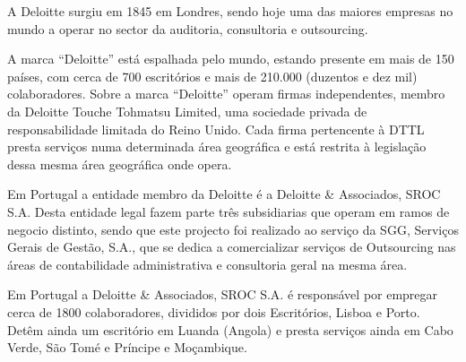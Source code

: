  A Deloitte surgiu em 1845 em Londres, sendo hoje uma das maiores empresas no mundo a operar no sector da auditoria, consultoria e outsourcing.
\par A marca “Deloitte” está espalhada pelo mundo, estando presente em mais de 150 países, com cerca de 700 escritórios e mais de 210.000 (duzentos e dez mil) colaboradores. Sobre a marca “Deloitte” operam firmas independentes, membro da Deloitte Touche Tohmatsu Limited, uma sociedade privada de responsabilidade limitada do Reino Unido. Cada firma pertencente à DTTL presta serviços numa determinada área geográfica e está restrita à legislação dessa mesma área geográfica onde opera.
\par Em Portugal a entidade membro da Deloitte é a Deloitte \& Associados, SROC S.A. Desta entidade legal fazem parte três subsidiarias que operam em ramos de negocio distinto, sendo que este projecto foi realizado ao serviço da SGG, Serviços Gerais de Gestão, S.A., que se dedica a comercializar serviços de Outsourcing nas áreas de contabilidade administrativa e consultoria geral na mesma área.
\par Em Portugal a Deloitte \& Associados, SROC S.A. é responsável por empregar cerca de 1800 colaboradores, divididos por dois Escritórios, Lisboa e Porto. Detêm ainda um escritório em Luanda (Angola) e presta serviços ainda em Cabo Verde, São Tomé e Príncipe e Moçambique.

